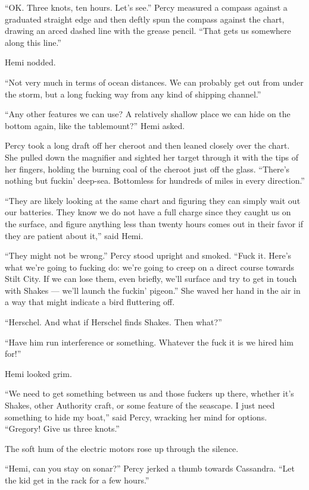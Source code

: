 \documentclass[
]{scrbook}
\begin{document}
``OK. Three knots, ten hours. Let's see.'' Percy measured a compass
against a graduated straight edge and then deftly spun the compass
against the chart, drawing an arced dashed line with the grease pencil.
``That gets us somewhere along this line.''

Hemi nodded.

``Not very much in terms of ocean distances. We can probably get out
from under the storm, but a long fucking way from any kind of shipping
channel.''

``Any other features we can use? A relatively shallow place we can hide
on the bottom again, like the tablemount?'' Hemi asked.

Percy took a long draft off her cheroot and then leaned closely over the
chart. She pulled down the magnifier and sighted her target through it
with the tips of her fingers, holding the burning coal of the cheroot
just off the glass. ``There's nothing but fuckin' deep-sea. Bottomless
for hundreds of miles in every direction.''

``They are likely looking at the same chart and figuring they can simply
wait out our batteries. They know we do not have a full charge since
they caught us on the surface, and figure anything less than twenty
hours comes out in their favor if they are patient about it,'' said
Hemi.

``They might not be wrong.'' Percy stood upright and smoked. ``Fuck it.
Here's what we're going to fucking do: we're going to creep on a direct
course towards Stilt City. If we can lose them, even briefly, we'll
surface and try to get in touch with Shakes --- we'll launch the fuckin'
pigeon.'' She waved her hand in the air in a way that might indicate a
bird fluttering off.

``Herschel. And what if Herschel finds Shakes. Then what?''

``Have him run interference or something. Whatever the fuck it is we
hired him for!''

Hemi looked grim.

``We need to get something between us and those fuckers up there,
whether it's Shakes, other Authority craft, or some feature of the
seascape. I just need something to hide my boat,'' said Percy, wracking
her mind for options. ``Gregory! Give us three knots.''

The soft hum of the electric motors rose up through the silence.

``Hemi, can you stay on sonar?'' Percy jerked a thumb towards Cassandra.
``Let the kid get in the rack for a few hours.''
\end{document}

